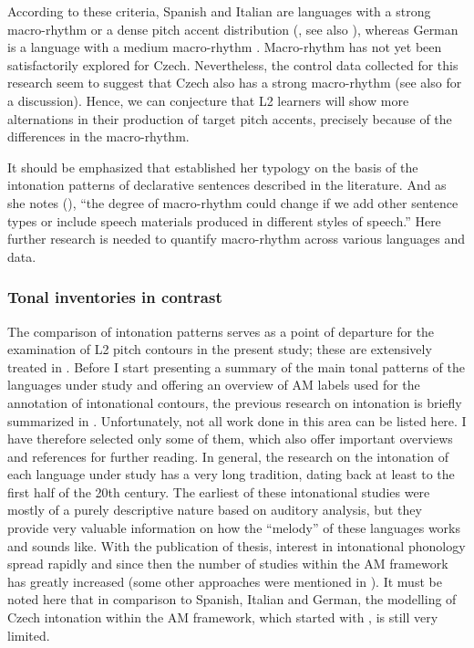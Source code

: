 According to these criteria, Spanish and Italian are languages with a strong macro-rhythm or a dense pitch accent distribution (\citealt{Jun2014}, see also \citealt{FrotaPrieto2015}), whereas German is a language with a medium macro-rhythm \citep{Jun2014}. Macro-rhythm has not yet been satisfactorily explored for Czech. Nevertheless, the control data collected for this research seem to suggest that Czech also has a strong macro-rhythm (see also \citealt{PeškováForthcoming} for a discussion). Hence, we can conjecture that L2 learners will show more alternations in their production of target pitch accents, precisely because of the differences in the macro-rhythm.


It should be emphasized that \citet{Jun2014} established her typology on the basis of the intonation patterns of declarative sentences described in the literature. And as she notes (\citeyear[539]{Jun2014}), “the degree of macro-rhythm could change if we add other sentence types or include speech materials produced in different styles of speech.” Here further research is needed to quantify macro-rhythm across various languages and data.


\subsubsection{Tonal inventories in contrast}\label{sec:2.3.2.4}

The comparison of intonation patterns serves as a point of departure for the examination of L2 pitch contours in the present study; these are extensively treated in . Before I start presenting a summary of the main tonal patterns of the languages under study and offering an overview of AM labels used for the annotation of intonational contours, the previous research on intonation is briefly summarized in . Unfortunately, not all work done in this area can be listed here. I have therefore selected only some of them, which also offer important overviews and references for further reading. In general, the research on the intonation of each language under study has a very long tradition, dating back at least to the first half of the 20th century. The earliest of these intonational studies were mostly of a purely descriptive nature based on auditory analysis, but they provide very valuable information on how the ``melody'' of these languages works and sounds like. With the publication of  thesis, interest in intonational phonology spread rapidly and since then the number of studies within the AM framework has greatly increased (some other approaches were mentioned in ). It must be noted here that in comparison to Spanish, Italian and German, the modelling of Czech intonation within the AM framework, which started with \citet{Duběda2011, Duběda2014}, is still very limited.

